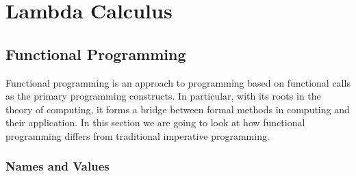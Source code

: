 \chapter{Lambda Calculus}

\section{Functional Programming }
Functional programming is an approach to programming based on functional calls as the primary programming constructs. In particular, with its roots in the theory of computing, it forms a bridge between formal methods in computing and their application. In this section we are going to look at how functional programming differs from traditional imperative programming.
\subsection{Names and Values}

